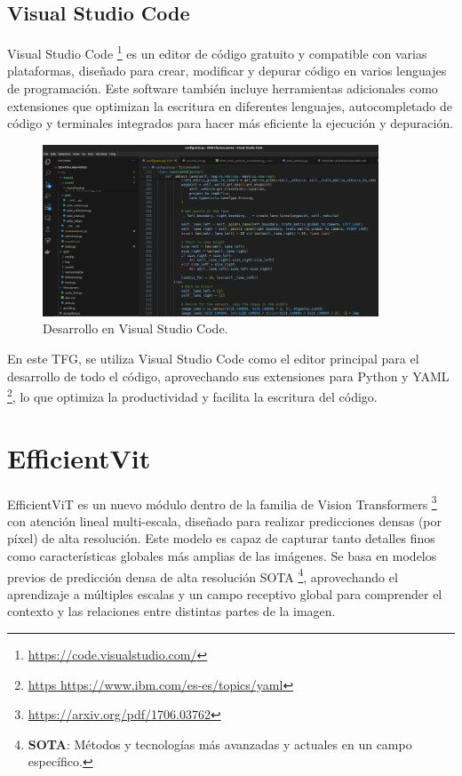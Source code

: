 \subsection{Visual Studio Code}
\label{sec:vs_code}

Visual Studio Code \footnote{\url{https://code.visualstudio.com/}} es un editor de código gratuito y compatible con varias plataformas, diseñado para crear, modificar y depurar código en varios lenguajes de programación. Este software también incluye herramientas adicionales como extensiones que optimizan la escritura en diferentes lenguajes, autocompletado de código y terminales integrados para hacer más eficiente la ejecución y depuración.

\begin{figure}[ht]
  \begin{center}
    \includegraphics[width=10cm]{figs/Plataformas_Desarollo/visual_code.png}
  \end{center}
  \caption{Desarrollo en Visual Studio Code.}
  \label{foto_code}
\end{figure}

En este \ac{TFG}, se utiliza Visual Studio Code como el editor principal para el desarrollo de todo el código, aprovechando sus extensiones para Python y YAML \footnote{\url{https https://www.ibm.com/es-es/topics/yaml}}, lo que optimiza la productividad y facilita la escritura del código.

\section{EfficientVit}
\label{sec:ef}

EfficientViT es un nuevo módulo dentro de la familia de Vision Transformers \footnote{\url{https://arxiv.org/pdf/1706.03762}} con atención lineal multi-escala, diseñado para realizar predicciones densas (por píxel) de alta resolución. Este modelo es capaz de capturar tanto detalles finos como características globales más amplias de las imágenes. Se basa en modelos previos de predicción densa de alta resolución \ac{SOTA} \footnote{\textbf{ \ac{SOTA}}: Métodos y tecnologías más avanzadas y actuales en un campo específico.}, aprovechando el aprendizaje a múltiples escalas y un campo receptivo global para comprender el contexto y las relaciones entre distintas partes de la imagen.

